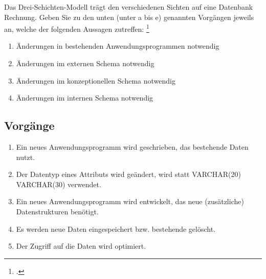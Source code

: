 \documentclass{bschlangaul-aufgabe}
\begin{document}

Das Drei-Schichten-Modell trägt den verschiedenen Sichten auf eine
Datenbank Rechnung. Geben Sie zu den unten (unter a bis e) genannten
Vorgängen jeweils an, welche
der folgenden Aussagen zutreffen:
\footcite{db:ab:klausurvorbereitung}

\begin{enumerate}
\item Änderungen in bestehenden Anwendungsprogrammen notwendig
\item Änderungen im externen Schema notwendig
\item Änderungen im konzeptionellen Schema notwendig
\item Änderungen im internen Schema notwendig
\end{enumerate}

\subsection{Vorgänge}

\begin{enumerate}


\item Ein neues Anwendungsprogramm wird geschrieben, das bestehende
Daten nutzt.


\item Der Datentyp eines Attributs wird geändert, \zB wird statt
VARCHAR(20) VARCHAR(30) verwendet.


\item Ein neues Anwendungsprogramm wird entwickelt, das neue
(zusätzliche) Datenstrukturen benötigt.


\item Es werden neue Daten eingespeichert bzw. bestehende gelöscht.


\item Der Zugriff auf die Daten wird optimiert.
\end{enumerate}
\end{document}
